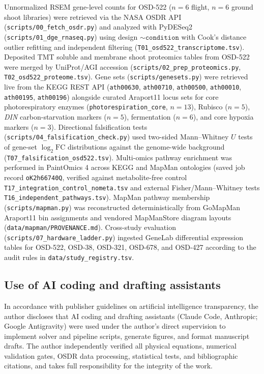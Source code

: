 \documentclass[preprint,11pt,numbers,sort&compress]{elsarticle}
\begin{document}
Unnormalized RSEM gene-level counts for OSD-522 ($n=6$ flight, $n=6$ ground shoot libraries) were retrieved via the NASA OSDR API (\texttt{scripts/00\_fetch\_osdr.py}) and analyzed with PyDESeq2 \citep{pydeseq2} (\texttt{scripts/01\_dge\_rnaseq.py}) using design $\sim\texttt{condition}$ with Cook's distance outlier refitting and independent filtering (\texttt{T01\_osd522\_transcriptome.tsv}). Deposited TMT soluble and membrane shoot proteomics tables from OSD-522 were merged by UniProt/AGI accession (\texttt{scripts/02\_prep\_proteomics.py}, \texttt{T02\_osd522\_proteome.tsv}). Gene sets (\texttt{scripts/genesets.py}) were retrieved live from the KEGG REST API \citep{kanehisa2000,kegg} (\texttt{ath00630}, \texttt{ath00710}, \texttt{ath00500}, \texttt{ath00010}, \texttt{ath00195}, \texttt{ath00196}) alongside curated Araport11 locus sets for core photorespiratory enzymes (\texttt{photorespiration\_core}, $n=13$), Rubisco ($n=5$), \textit{DIN} carbon-starvation markers ($n=5$), fermentation ($n=6$), and core hypoxia markers ($n=3$). Directional falsification tests (\texttt{scripts/04\_falsification\_check.py}) used two-sided Mann--Whitney $U$ tests of gene-set $\log_2\mathrm{FC}$ distributions against the genome-wide background (\texttt{T07\_falsification\_osd522.tsv}). Multi-omics pathway enrichment was performed in PaintOmics 4 \citep{paintomics4} across KEGG and MapMan ontologies (saved job record \texttt{oK2h66740Q}, verified against metabolite-free control \texttt{T17\_integration\_control\_nometa.tsv} and external Fisher/Mann--Whitney tests \texttt{T16\_independent\_pathways.tsv}). MapMan pathway membership (\texttt{scripts/mapman.py}) was reconstructed deterministically from GoMapMan Araport11 bin assignments and vendored MapManStore diagram layouts (\texttt{data/mapman/PROVENANCE.md}). Cross-study evaluation (\texttt{scripts/07\_hardware\_ladder.py}) ingested GeneLab differential expression tables for OSD-522, OSD-38, OSD-321, OSD-678, and OSD-427 according to the audit rules in \texttt{data/study\_registry.tsv}.

\subsection{Use of AI coding and drafting assistants}

In accordance with publisher guidelines on artificial intelligence transparency, the author discloses that AI coding and drafting assistants (Claude Code, Anthropic; Google Antigravity) were used under the author's direct supervision to implement solver and pipeline scripts, generate figures, and format manuscript drafts. The author independently verified all physical equations, numerical validation gates, OSDR data processing, statistical tests, and bibliographic citations, and takes full responsibility for the integrity of the work.
\end{document}
